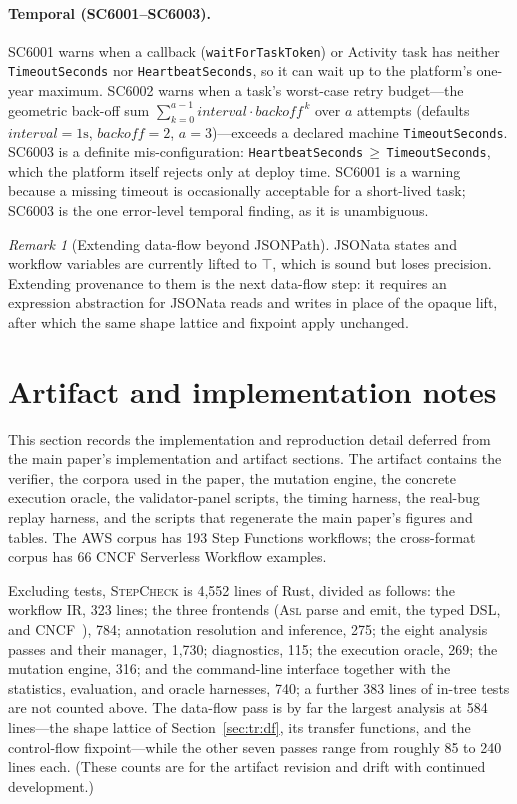 \documentclass[11pt]{article}
\newcommand{\code}[1]{\textsf{\small #1}}
\newcommand{\tool}{\textsc{StepCheck}}
\newcommand{\asl}{\textsc{Asl}}
\theoremstyle{plain}
\theoremstyle{definition}
\theoremstyle{remark}
\newtheorem{remark}{Remark}
\begin{document}
\paragraph{Temporal (\code{SC6001}--\code{SC6003}).}
\code{SC6001} warns when a callback (\texttt{waitForTaskToken}) or Activity task has neither
\texttt{TimeoutSeconds} nor \texttt{HeartbeatSeconds}, so it can wait up to the platform's
one-year maximum. \code{SC6002} warns when a task's worst-case retry budget---the geometric
back-off sum $\sum_{k=0}^{a-1}\mathit{interval}\cdot\mathit{backoff}^{\,k}$ over $a$ attempts
(defaults $\mathit{interval}=1\mathrm{s}$, $\mathit{backoff}=2$, $a=3$)---exceeds a declared
machine \texttt{TimeoutSeconds}. \code{SC6003} is a definite mis-configuration:
\texttt{HeartbeatSeconds}\,$\geq$\,\texttt{TimeoutSeconds}, which the platform itself rejects
only at deploy time. \code{SC6001} is a warning because a missing timeout is occasionally
acceptable for a short-lived task; \code{SC6003} is the one error-level temporal finding, as
it is unambiguous.

\begin{remark}[Extending data-flow beyond JSONPath]
JSONata states and workflow variables are currently lifted to $\top$, which is sound but loses
precision. Extending provenance to them is the next data-flow step: it requires an expression
abstraction for JSONata reads and writes in place of the opaque lift, after which the same shape
lattice and fixpoint apply unchanged.
\end{remark}

\section{Artifact and implementation notes}
\label{sec:tr:impl}

This section records the implementation and reproduction detail deferred from the main paper's
implementation and artifact sections. The artifact contains the verifier, the corpora used in the
paper, the mutation engine, the concrete execution oracle, the validator-panel scripts, the timing
harness, the real-bug replay harness, and the scripts that regenerate the main paper's figures and
tables. The AWS corpus has 193 Step Functions workflows; the cross-format corpus has 66 CNCF
Serverless Workflow examples.

Excluding tests, \tool{} is 4{,}552 lines of Rust, divided as follows: the workflow IR,
323 lines; the three frontends (\asl{} parse and emit, the typed DSL, and CNCF~\cite{cncf}), 784; annotation
resolution and inference, 275; the eight analysis passes and their manager, 1{,}730;
diagnostics, 115; the execution oracle, 269; the mutation engine, 316; and the command-line
interface together with the statistics, evaluation, and oracle harnesses, 740; a further 383
lines of in-tree tests are not counted above. The data-flow pass is by far the largest analysis
at 584 lines---the shape lattice of Section~\ref{sec:tr:df}, its transfer functions, and the
control-flow fixpoint---while the other seven passes range from roughly 85 to 240 lines each.
(These counts are for the artifact revision and drift with continued development.)
\end{document}
